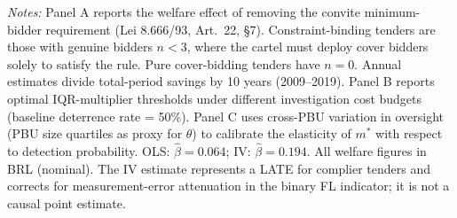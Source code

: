 \begin{table}[htbp]
\begin{tabular}{lp{6.5cm}rr}
\bottomrule
\end{tabular}
\begin{tablenotes}\small
\item \textit{Notes:} Panel A reports the welfare effect of removing the
  convite minimum-bidder requirement (Lei 8.666/93, Art.~22, \S7).
  Constraint-binding tenders are those with genuine bidders $n < 3$,
  where the cartel must deploy cover bidders solely to satisfy the rule.
  Pure cover-bidding tenders have $n=0$.
  Annual estimates divide total-period savings by 10 years (2009--2019).
  Panel B reports optimal IQR-multiplier thresholds under different
  investigation cost budgets (baseline deterrence rate = 50\%).
  Panel C uses cross-PBU variation in oversight (PBU size quartiles as
  proxy for $\theta$) to calibrate the elasticity of $m^*$ with respect
  to detection probability. OLS: $\hat{\beta} = 0.064$;
  IV: $\hat{\beta} = 0.194$. All welfare figures in BRL (nominal).
  The IV estimate represents a LATE for complier tenders and corrects for measurement-error attenuation in the binary FL indicator; it is not a causal point estimate.
\end{tablenotes}
\end{table}
